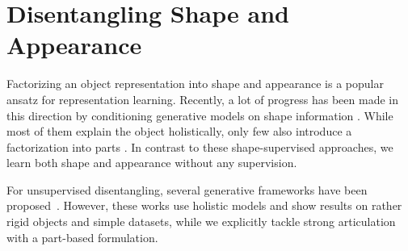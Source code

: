 
\section{Disentangling Shape and Appearance}
	Factorizing an object representation into shape and appearance is a popular ansatz for representation learning.
	Recently, a lot of progress has been made in this direction by conditioning generative models on shape information \cite{esser18, ma17poseguided, debem18dgpose, ma17disperson, siarohin18deformgan, balakrishnan18unseenposes}.
	While most of them explain the object holistically, only few also introduce a factorization into parts \cite{siarohin18deformgan, balakrishnan18unseenposes}.
	In contrast to these shape-supervised approaches, we learn both shape and appearance without any supervision.

	For unsupervised disentangling, several generative frameworks have been proposed~\cite{higgins16betavae, chen16infogan, li18analogy, denton17disvideo, shu18shapeappear, xing18shapeappear}.
	However, these works use holistic models and show results on rather rigid objects and simple datasets, while we explicitly tackle strong articulation with a part-based formulation.


